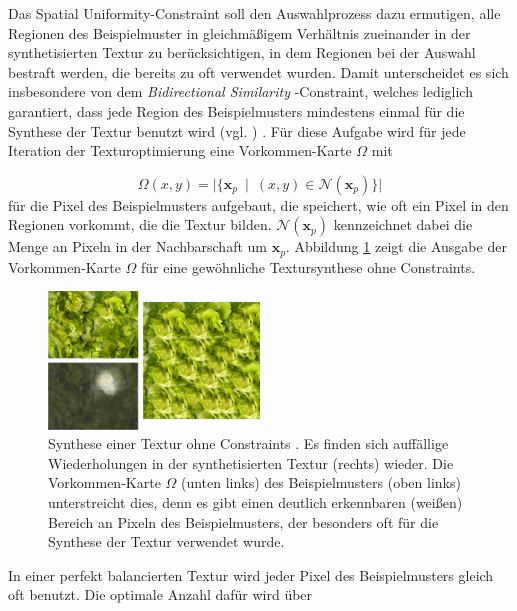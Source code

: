 Das \glqq Spatial Uniformity\grqq -Constraint soll den Auswahlprozess dazu ermutigen, alle Regionen des Beispielmuster in gleichmäßigem Verhältnis zueinander in der synthetisierten Textur zu berücksichtigen, in dem Regionen bei der Auswahl bestraft werden, die bereits zu oft verwendet wurden.
Damit unterscheidet es sich insbesondere von dem \emph{\glqq Bidirectional Similarity\grqq} -Constraint, welches lediglich garantiert, dass jede Region des Beispielmusters mindestens einmal für die Synthese der Textur benutzt wird (vgl. \cite{BidirectionalSimilarity}) \cite{SelfTuning}.
Für diese Aufgabe wird für jede Iteration der Texturoptimierung eine Vorkommen-Karte $\Omega$ mit

\begin{equation*}
	\Omega(x,y) = \big| \lbrace \textbf{x}_p \ \mid \ (x,y) \in \mathcal{N}(\textbf{x}_p) \rbrace \big|
\end{equation*}
für die Pixel des Beispielmusters aufgebaut, die speichert, wie oft ein Pixel in den Regionen vorkommt, die die Textur bilden.
$\mathcal{N}(\textbf{x}_p)$ kennzeichnet dabei die Menge an Pixeln in der Nachbarschaft um $\textbf{x}_p$.
Abbildung \ref{occurence-map} zeigt die Ausgabe der Vorkommen-Karte $\Omega$ für eine gewöhnliche Textursynthese ohne Constraints.

\begin{figure}
	\centering
	\includegraphics[width=0.5\textwidth]{images/occurence-map}
	\caption{
		Synthese einer Textur ohne Constraints \cite{SelfTuning}.
		Es finden sich auffällige Wiederholungen in der synthetisierten Textur (rechts) wieder.
		Die Vorkommen-Karte $\Omega$ (unten links) des Beispielmusters (oben links) unterstreicht dies, denn es gibt einen deutlich erkennbaren (weißen) Bereich an Pixeln des Beispielmusters, der besonders oft für die Synthese der Textur verwendet wurde.
	}
	\label{occurence-map}
\end{figure}

In einer perfekt balancierten Textur wird jeder Pixel des Beispielmusters gleich oft benutzt.
Die optimale Anzahl dafür wird über

